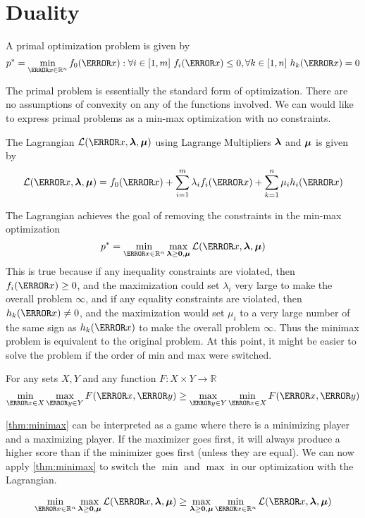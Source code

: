 \section{Duality}
\begin{definition}
	A primal optimization problem is given by
	\[
		p^* = \min_{\V{x}\in\mathbb{R}^n} f_0(\V{x}) : \forall i\in[1,m]\ f_i(\V{x}) \leq 0, \forall k\in[1,n]\ h_k(\V{x}) = 0
	\]
	\label{defn:primal}
\end{definition}
The primal problem is essentially the standard form of optimization.
There are no assumptions of convexity on any of the functions involved.
We can would like to express primal problems as a min-max optimization with no constraints.
\begin{definition}
	The Lagrangian $\mathcal{L}(\V{x}, \bs{\lambda}, \bs{\mu})$ using Lagrange Multipliers $\boldsymbol{\lambda}$ and $\boldsymbol{\mu}$ is given by 
	\[
		\mathcal{L}(\V{x}, \bs{\lambda}, \bs{\mu}) = f_0(\V{x}) + \sum_{i=1}^m\lambda_i f_i(\V{x}) + \sum_{k=1}^n \mu_i h_i(\V{x})
	\]
	\label{defn:lagrangian}
\end{definition}
The Lagrangian achieves the goal of removing the constraints in the min-max optimization
\[
	p^* = \min_{\V{x}\in\mathbb{R}^n}\max_{\bs{\lambda}\geq \bs{0}, \bs{\mu}} \mathcal{L}(\V{x}, \bs{\lambda}, \bs{\mu})
\]
This is true because if any inequality constraints are violated, then $f_i(\V{x}) \geq 0$, and the maximization could set $\lambda_i$ very large to make the overall problem $\infty$, and if any equality constraints are violated, then $h_k(\V{x}) \ne 0$, and the maximization would set $\mu_i$ to a very large number of the same sign as $h_k(\V{x})$ to make the overall problem $\infty$.
Thus the minimax problem is equivalent to the original problem.
At this point, it might be easier to solve the problem if the order of min and max were switched.
\begin{theorem}
	For any sets $X, Y$ and any function $F:X\times Y\to\mathbb{R}$ \[
		\min_{\V{x}\in X}\max_{\V{y}\in Y} F(\V{x}, \V{y}) \geq \max_{\V{y}\in Y}\min_{\V{x}\in X}F(\V{x}, \V{y})
	\]
	\label{thm:minimax}
\end{theorem}
\cref{thm:minimax} can be interpreted as a game where there is a minimizing player and a maximizing player.
If the maximizer goes first, it will always produce a higher score than if the minimizer goes first (unless they are equal).
We can now apply \cref{thm:minimax} to switch the $\min$ and $\max$ in our optimization with the Lagrangian.
\begin{theorem}
	\[
		\min_{\V{x}\in\mathbb{R}^n}\max_{\bs{\lambda}\geq \bs{0}, \bs{\mu}} \mathcal{L}(\V{x}, \bs{\lambda}, \bs{\mu}) \geq \max_{\bs{\lambda}\geq \bs{0}, \bs{\mu}} \min_{\V{x}\in\mathbb{R}^n} \mathcal{L}(\V{x}, \bs{\lambda}, \bs{\mu})
	\]

	\label{thm:weak-duality}
\end{theorem}
